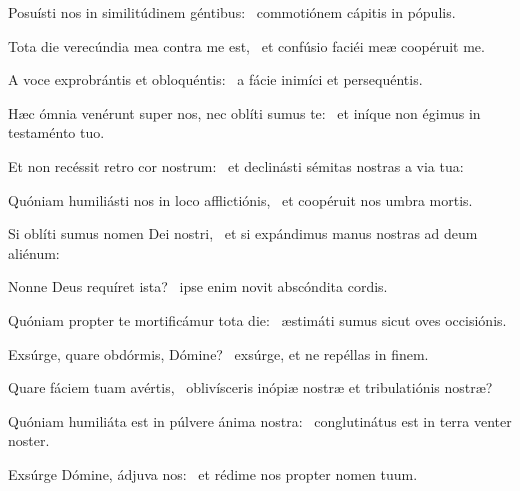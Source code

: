\item Posuísti nos in similitúdinem géntibus:~\psstar{} commotiónem cápitis in pópulis.

\item Tota die verecúndia mea contra me est,~\psstar{} et confúsio faciéi meæ coopéruit me.

\item A voce exprobrántis et obloquéntis:~\psstar{} a fácie inimíci et persequéntis.

\item Hæc ómnia venérunt super nos, nec oblíti sumus te:~\psstar{} et iníque non égimus in testaménto tuo.

\item Et non recéssit retro cor nostrum:~\psstar{} et declinásti sémitas nostras a via tua:

\item Quóniam humiliásti nos in loco afflictiónis,~\psstar{} et coopéruit nos umbra mortis.

\item Si oblíti sumus nomen Dei nostri,~\psstar{} et si expándimus manus nostras ad deum aliénum:

\item Nonne Deus requíret ista?~\psstar{} ipse enim novit abscóndita cordis.

\item Quóniam propter te mortificámur tota die:~\psstar{} æstimáti sumus sicut oves occisiónis.

\item Exsúrge, quare obdórmis, Dómine?~\psstar{} exsúrge, et ne repéllas in finem.

\item Quare fáciem tuam avértis,~\psstar{} oblivísceris inópiæ nostræ et tribulatiónis nostræ?

\item Quóniam humiliáta est in púlvere ánima nostra:~\psstar{} conglutinátus est in terra venter noster.

\item Exsúrge Dómine, ádjuva nos:~\psstar{} et rédime nos propter nomen tuum.